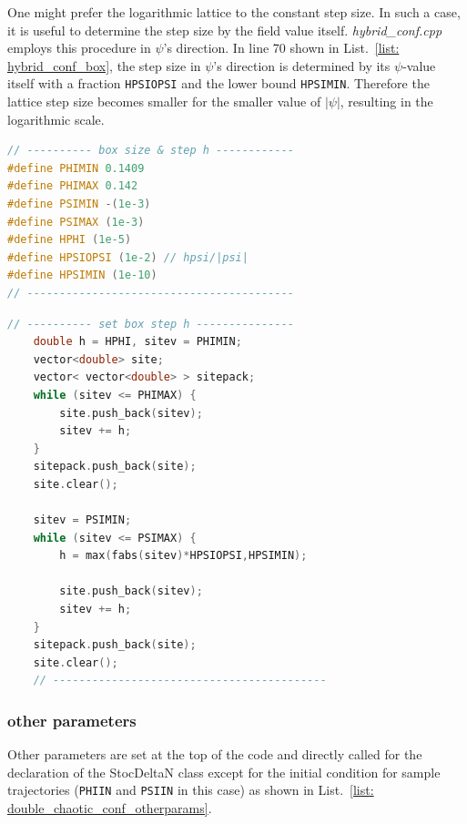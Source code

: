 \documentclass[aps, prd
, preprint
, nofootinbib 
, notitlepage
, superscriptaddress
, longbibliography
]{revtex4-1}
\begin{document}
One might prefer the logarithmic lattice to the constant step size. In such a case, it is useful to determine the step size by the field value itself.
\textit{hybrid\_conf.cpp} employs this procedure in $\psi$'s direction.
In line 70 shown in List.~\ref{list: hybrid_conf_box}, the step size in $\psi$'s direction is determined by its $\psi$-value itself with a fraction \texttt{HPSIOPSI}
and the lower bound \texttt{HPSIMIN}. Therefore the lattice step size becomes smaller for the smaller value of $|\psi|$, resulting in the logarithmic scale.

\begin{lstlisting}[language = C++, caption={\textit{sample/hybrid\_conf.cpp}}, label=list: hybrid_conf_box, firstnumber = 6]
// ---------- box size & step h ------------
#define PHIMIN 0.1409
#define PHIMAX 0.142
#define PSIMIN -(1e-3)
#define PSIMAX (1e-3)
#define HPHI (1e-5)
#define HPSIOPSI (1e-2) // hpsi/|psi|
#define HPSIMIN (1e-10)
// -----------------------------------------
\end{lstlisting}
\begin{lstlisting}[language = C++, firstnumber = 57]
	// ---------- set box step h ---------------
	double h = HPHI, sitev = PHIMIN;
	vector<double> site;
	vector< vector<double> > sitepack;
	while (sitev <= PHIMAX) {
		site.push_back(sitev);
		sitev += h;
	}
	sitepack.push_back(site);
	site.clear();

	sitev = PSIMIN;
	while (sitev <= PSIMAX) {
		h = max(fabs(sitev)*HPSIOPSI,HPSIMIN);

		site.push_back(sitev);
		sitev += h;	
	}
	sitepack.push_back(site);
	site.clear();
	// ------------------------------------------
\end{lstlisting}

\subsubsection{other parameters}

Other parameters are set at the top of the code and directly called for the declaration of the StocDeltaN class except for the initial condition for sample trajectories
(\texttt{PHIIN} and \texttt{PSIIN} in this case) as shown in List.~\ref{list: double_chaotic_conf_otherparams}.
\end{document}
